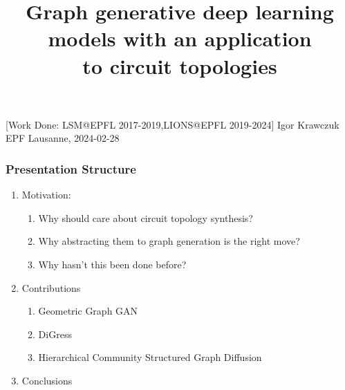 \documentclass[11pt,xcolor={dvipsnames},hyperref={pdftex,pdfpagemode=UseNone,hidelinks,pdfdisplaydoctitle=true},usepdftitle=false]{beamer}
\begin{document}
\title{\justifying Graph generative deep learning models with an application\\ to circuit topologies}
\information%
[Work Done: LSM@EPFL 2017-2019,LIONS@EPFL 2019-2024]%
{Igor Krawczuk}%
{EPF Lausanne,  2024-02-28}
\frame[label=title]{\titlepage}

\begin{frame}[label=done]
  \frametitle{Presentation Structure}
  \centering
  \begin{enumerate}
    \item Motivation:
      \begin{enumerate}
        \item Why should care about circuit topology synthesis?
        \item Why abstracting them to graph generation is the right move?
        \item Why hasn't this been done before?
      \end{enumerate}
    \item Contributions
      \begin{enumerate}
        \item Geometric Graph GAN
        \item DiGress
        \item Hierarchical Community Structured Graph Diffusion
      \end{enumerate}
    \item Conclusions %
  \end{enumerate} 
  \vspace{1cm} %
\end{frame}







\lastslide

\end{document}
